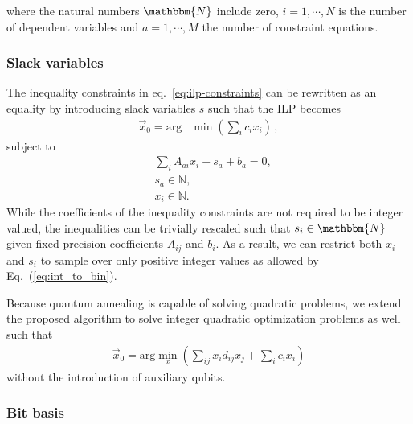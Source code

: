 \documentclass[prd,twocolumn,tightenlines,preprintnumbers,showpacs,superscriptaddress,notitlepage,nofootinbib,eqsecnum,floatfix,longbibliography]{revtex4}
\begin{document}
where the natural numbers $\mathbbm{N}$ include zero, $i=1, \cdots,  N$ is the number of dependent variables and $a=1, \cdots, M$ the number of constraint equations.


\subsubsection{Slack variables}
\label{sec:methods:slack}


The inequality constraints in eq.~\eqref{eq:ilp-constraints} can be rewritten as an equality by introducing slack variables $s$ such that the ILP becomes
\begin{align}
    \vec x_0 = \mathrm{arg} &\min(\sum_i c_i x_i)\,,
\end{align}
subject to
\begin{align}& \sum_i A_{a i}x_i + s_a + b_a = 0,\\
    & s_a \in \mathbb{N},\\
    & x_i \in \mathbb{N}.
\end{align}
While the coefficients of the inequality constraints are not required to be integer valued, the inequalities can be trivially rescaled such that $s_i \in \mathbbm{N}$ given fixed precision coefficients $A_{ij}$ and $b_i$.
As a result, we can restrict both $x_i$ and $s_i$ to sample over only positive integer values as allowed by Eq.~(\ref{eq:int_to_bin}).

Because quantum annealing is capable of solving quadratic problems, we extend the proposed algorithm to solve integer quadratic optimization problems as well such that
\begin{align}
    \vec x_0 = \mathrm{arg}\min\limits_{x}\left(\sum_{ij} x_i d_{ij} x_j + \sum_i c_i x_i\right)
\end{align}
without the introduction of auxiliary qubits.

\subsubsection{Bit basis}
\label{sec:methods:bit-basis}
\end{document}
